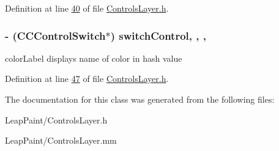 Definition at line \hyperlink{_controls_layer_8h_source_l00040}{40} of file \hyperlink{_controls_layer_8h_source}{Controls\-Layer.\-h}.

\hypertarget{interface_controls_layer_a8997cfae8a4f6bcfb8c53d8cab6bb480}{
\subsubsection[{switch\-Control}]{\setlength{\rightskip}{0pt plus 5cm}-\/ (C\-C\-Control\-Switch$\ast$) switch\-Control\hspace{0.3cm}{\ttfamily [read]}, {\ttfamily [write]}, {\ttfamily [nonatomic]}, {\ttfamily [strong]}}}\label{d1/d1a/interface_controls_layer_a8997cfae8a4f6bcfb8c53d8cab6bb480}
color\-Label displays name of color in hash value 

Definition at line \hyperlink{_controls_layer_8h_source_l00047}{47} of file \hyperlink{_controls_layer_8h_source}{Controls\-Layer.\-h}.



The documentation for this class was generated from the following files\-:\begin{DoxyCompactItemize}
\item 
Leap\-Paint/Controls\-Layer.\-h\item 
Leap\-Paint/Controls\-Layer.\-mm\end{DoxyCompactItemize}
